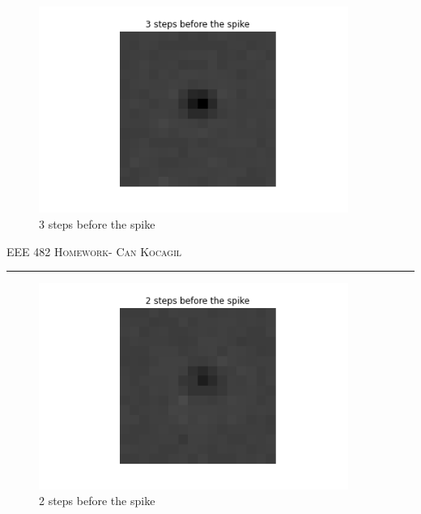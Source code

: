 \documentclass[12pt]{amsart}
\begin{document}
\begin{figure}[h]
    \centering
    \includegraphics[width = 0.9\textwidth]{images/3.png}
    \caption{3 steps before the spike}
\end{figure}


\newpage
{\scshape EEE 482} \hfill {\scshape \large  Homework-\relax} \hfill {\scshape Can Kocagil}
\smallskip
\hrule
\vspace{2mm}

\begin{figure}[h]
    \centering
    \includegraphics[width = 0.9\textwidth]{images/2.png}
    \caption{2 steps before the spike}
\end{figure}
\end{document}
